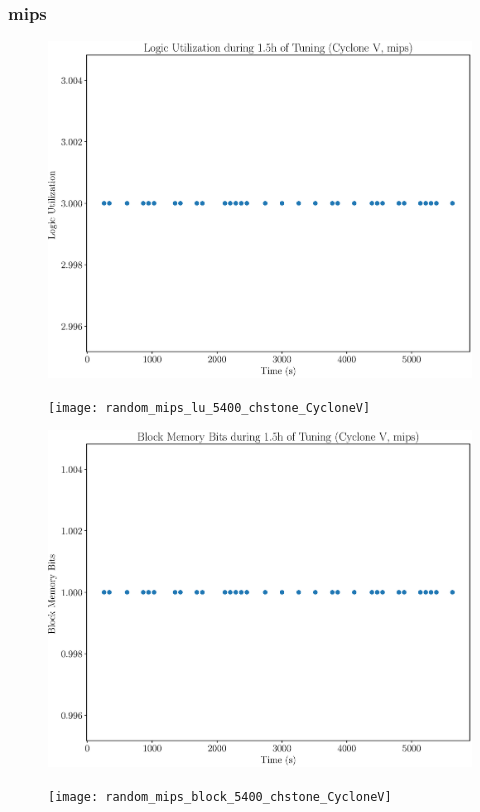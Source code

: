 \documentclass[12pt, a4paper]{article}
\begin{document}
\newpage

\subsubsection{mips}

\begin{figure}[htpb]
    \centering
    \noindent
    \begin{minipage}{.48\textwidth}
        \centering
        \includegraphics[scale=.25]{mips_lu_5400_chstone_CycloneV}
    \end{minipage}%
    \hfill
    \begin{minipage}{.48\textwidth}
        \centering
        \texttt{[image: random\_mips\_lu\_5400\_chstone\_CycloneV]}
    \end{minipage}%

    \begin{minipage}{.48\textwidth}
        \includegraphics[scale=.25]{mips_block_5400_chstone_CycloneV}
    \end{minipage}%
    \hfill
    \begin{minipage}{.48\textwidth}
        \texttt{[image: random\_mips\_block\_5400\_chstone\_CycloneV]}
    \end{minipage}%


\end{figure}
\end{document}
